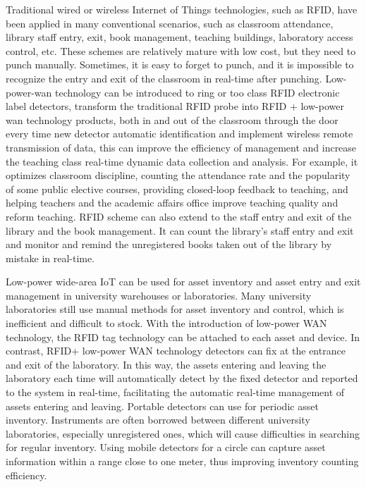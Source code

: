 \documentclass[conference]{IEEEtran}
\begin{document}
Traditional wired or wireless Internet of Things technologies, such as RFID, have been applied in many conventional scenarios, such as classroom attendance, library staff entry, exit, book management, teaching buildings, laboratory access control, etc. These schemes are relatively mature with low cost, but they need to punch manually. Sometimes, it is easy to forget to punch, and it is impossible to recognize the entry and exit of the classroom in real-time after punching. Low-power-wan technology can be introduced to ring or too class RFID electronic label detectors, transform the traditional RFID probe into RFID + low-power wan technology products, both in and out of the classroom through the door every time new detector automatic identification and implement wireless remote transmission of data, this can improve the efficiency of management and increase the teaching class real-time dynamic data collection and analysis. For example, it optimizes classroom discipline, counting the attendance rate and the popularity of some public elective courses, providing closed-loop feedback to teaching, and helping teachers and the academic affairs office improve teaching quality and reform teaching. RFID scheme can also extend to the staff entry and exit of the library and the book management. It can count the library's staff entry and exit and monitor and remind the unregistered books taken out of the library by mistake in real-time. 

Low-power wide-area IoT can be used for asset inventory and asset entry and exit management in university warehouses or laboratories. Many university laboratories still use manual methods for asset inventory and control, which is inefficient and difficult to stock. With the introduction of low-power WAN technology, the RFID tag technology can be attached to each asset and device. In contrast, RFID+ low-power WAN technology detectors can fix at the entrance and exit of the laboratory. In this way, the assets entering and leaving the laboratory each time will automatically detect by the fixed detector and reported to the system in real-time, facilitating the automatic real-time management of assets entering and leaving. Portable detectors can use for periodic asset inventory. Instruments are often borrowed between different university laboratories, especially unregistered ones, which will cause difficulties in searching for regular inventory. Using mobile detectors for a circle can capture asset information within a range close to one meter, thus improving inventory counting efficiency.
\end{document}
